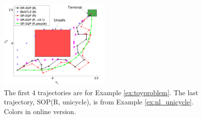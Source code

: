 \begin{figure}[t]
\centering
\includegraphics[width=0.49\textwidth]{figures/ToyExUni_alternate_scissored.pdf}
\vspace{-20pt}
\caption{{\small The first 4 trajectories are for Example \ref{ex:toyproblem}. The last trajectory, SOP(R, unicycle), is from Example \ref{ex:nl_unicycle}. Colors in online version.}}
\label{fig:toy control}
\vspace{-10pt}
\end{figure}


